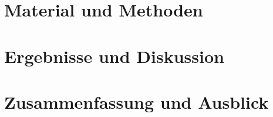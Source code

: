 \documentclass[%
	BCOR12mm, %
	cleardoublepage=empty, %
	tablecaptionabove, %
	toc=bib, %
	toc=listofnumbered, %
	listof=leveldown, %
	numbers=noendperiod %
	]{scrbook}
\renewcommand\appendix{\par
	\addchap{\appendixname}
	\setcounter{section}{0}%
	\setcounter{subsection}{0}%
	\setcounter{figure}{0}%
	\renewcommand\thesection{\Alph{section}}%
	\renewcommand\thefigure{\Alph{section}.\arabic{figure}} 
	\renewcommand\thetable{\Alph{section}.\arabic{table}}}
\begin{document}
\chapter{Material und Methoden} %
\label{cha:material_und_methoden}


\chapter{Ergebnisse und Diskussion} %
\label{cha:ergebnisse_und_diskussion}


\chapter{Zusammenfassung und Ausblick} %
\label{cha:zusammenfassung_und_ausblick}





\appendix

\listoffigures

\listoftables
\end{document}
